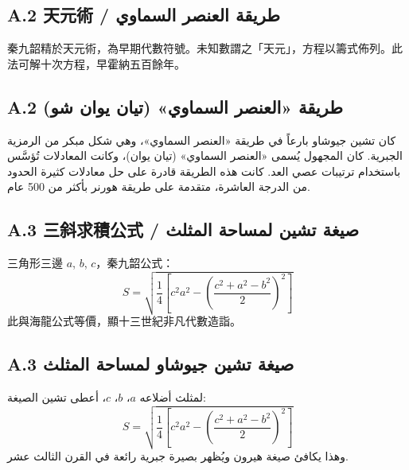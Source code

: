 \documentclass[11pt,a4paper]{article}
\begin{document}
\noindent
\begin{minipage}[t]{0.48\textwidth}
\subsection*{A.2 天元術 / طريقة العنصر السماوي}

秦九韶精於天元術，為早期代數符號。未知數謂之「天元」，方程以籌式佈列。此法可解十次方程，早霍納五百餘年。
\end{minipage}
\hfill
\begin{minipage}[t]{0.48\textwidth}
\arabicfont\beginR
\subsection*{A.2 طريقة «العنصر السماوي» (تيان يوان شو)}

كان تشين جيوشاو بارعاً في طريقة «العنصر السماوي»، وهي شكل مبكر من الرمزية الجبرية. كان المجهول يُسمى «العنصر السماوي» (تيان يوان)، وكانت المعادلات تُؤسَّس باستخدام ترتيبات عصي العد. كانت هذه الطريقة قادرة على حل معادلات كثيرة الحدود من الدرجة العاشرة، متقدمة على طريقة هورنر بأكثر من 500 عام.
\endR
\end{minipage}

\vspace{0.8cm}

\noindent
\begin{minipage}[t]{0.48\textwidth}
\subsection*{A.3 三斜求積公式 / صيغة تشين لمساحة المثلث}

三角形三邊 $a$, $b$, $c$，秦九韶公式：
\[
S = \sqrt{\frac{1}{4}\left[c^2a^2 - \left(\frac{c^2+a^2-b^2}{2}\right)^2\right]}
\]
此與海龍公式等價，顯十三世紀非凡代數造詣。
\end{minipage}
\hfill
\begin{minipage}[t]{0.48\textwidth}
\arabicfont\beginR
\subsection*{A.3 صيغة تشين جيوشاو لمساحة المثلث}

لمثلث أضلاعه $a$، $b$، $c$، أعطى تشين الصيغة:
\[
S = \sqrt{\frac{1}{4}\left[c^2a^2 - \left(\frac{c^2+a^2-b^2}{2}\right)^2\right]}
\]
وهذا يكافئ صيغة هيرون ويُظهر بصيرة جبرية رائعة في القرن الثالث عشر.
\endR
\end{minipage}

\vspace{0.8cm}
\end{document}
